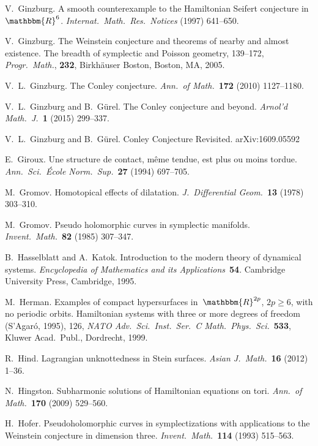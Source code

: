 \documentclass[12pt,twoside]{amsart}
\theoremstyle{plain}
\numberwithin{figure}{section}
\numberwithin{equation}{section}
\def\RR{\mathbbm{R}}
\begin{document}
\begin{thebibliography}{999}
V.\ Ginzburg.
A smooth counterexample to the Hamiltonian Seifert conjecture in $\RR^6$. 
{\it Internat.\ Math.\ Res.\ Notices} (1997) 641--650.

V.\ Ginzburg.
The Weinstein conjecture and theorems of nearby and almost existence. 
The breadth of symplectic and Poisson geometry, 139--172, {\it Progr.\ Math.}, {\bf 232}, 
Birkh\"auser Boston, Boston, MA, 2005.

V.\ L.\ Ginzburg.
The Conley conjecture. {\it Ann.\ of Math.}~{\bf 172} (2010) 1127--1180. 

V.\ L.\ Ginzburg and B.\ G\"urel. 
The Conley conjecture and beyond. 
{\it Arnol'd Math.\ J.}~{\bf 1} (2015) 299--337.

V.\ L.\ Ginzburg and B.\ G\"urel. 
Conley Conjecture Revisited.
arXiv:1609.05592 

E.\ Giroux.
Une structure de contact, m\^eme tendue, est plus ou moins tordue. 
{\it Ann.\ Sci.\ \'Ecole Norm.\ Sup.}~{\bf 27} (1994) 697--705.

M.\ Gromov.
Homotopical effects of dilatation.
{\it J.~Differential Geom.}~{\bf 13} (1978) 303--310.

M.\ Gromov.
Pseudo holomorphic curves in symplectic manifolds.
{\it Invent.\ Math.}~{\bf 82} (1985) 307--347.


B.\ Hasselblatt and A.\ Katok.
Introduction to the modern theory of dynamical systems.
{\it Encyclopedia of Mathematics and its Applications}~{\bf 54}. 
Cambridge University Press, Cambridge, 1995. 


M.\ Herman.
Examples of compact hypersurfaces in~$\RR^{2p}$, $2p \ge 6$, with no periodic orbits. 
Hamiltonian systems with three or more degrees of freedom (S'Agar\'o, 1995), 126,  
{\it NATO Adv.\ Sci.\ Inst.\ Ser.\ C Math.\ Phys.\ Sci.}~{\bf 533},  
Kluwer Acad.\ Publ., Dordrecht, 1999. 


R.\ Hind.
Lagrangian unknottedness in Stein surfaces. 
{\it Asian J.\ Math.}~{\bf 16} (2012) 1--36.

N.\ Hingston.
Subharmonic solutions of Hamiltonian equations on tori. 
{\it Ann.\ of Math.}~{\bf 170} (2009) 529--560. 

H.\ Hofer.
Pseudoholomorphic curves in symplectizations with applications to the Weinstein conjecture in dimension three. 
{\it Invent.\ Math.}~{\bf 114} (1993) 515--563.


\end{thebibliography}
\end{document}
